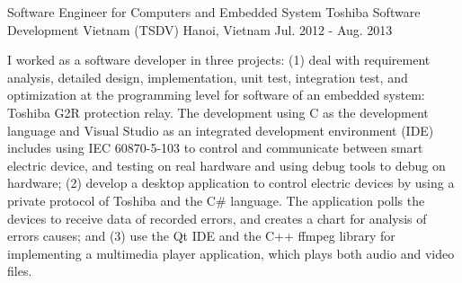 \begin{cventries}
\cventry
{Software Engineer for Computers and Embedded System} %
{Toshiba Software Development Vietnam (TSDV)} %
{Hanoi, Vietnam} %
{Jul. 2012 - Aug. 2013} %
{ %
	\begin{cvitems}
		\item {I worked as a software developer in three projects: (1) deal with requirement analysis, detailed design, implementation, unit test, integration test, and optimization at the programming level for software of an embedded system: Toshiba G2R protection relay. The development using C as the development language and Visual Studio as an integrated development environment (IDE) includes using IEC 60870-5-103 to control and communicate between smart electric device, and testing on real hardware and using debug tools to debug on hardware; (2) develop a desktop application to control electric devices by using a private protocol of Toshiba and the C\# language. The application polls the devices to receive data of recorded errors, and creates a chart for analysis of errors causes; and (3) use the Qt IDE and the C++ ffmpeg library for implementing a multimedia player application, which plays both audio and video files.}		
	\end{cvitems}
}

%

\end{cventries}